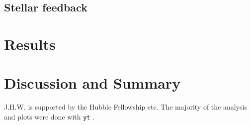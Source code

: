 \documentclass[apjl]{emulateapj}
\begin{document}
\subsection{Stellar feedback}

\section{Results}
\label{sec:results}

\section{Discussion and Summary}

\acknowledgments

J.H.W. is supported by the Hubble Fellowship etc.  The majority of the
analysis and plots were done with \texttt{yt} \citep{yt}.

%

\end{document}

